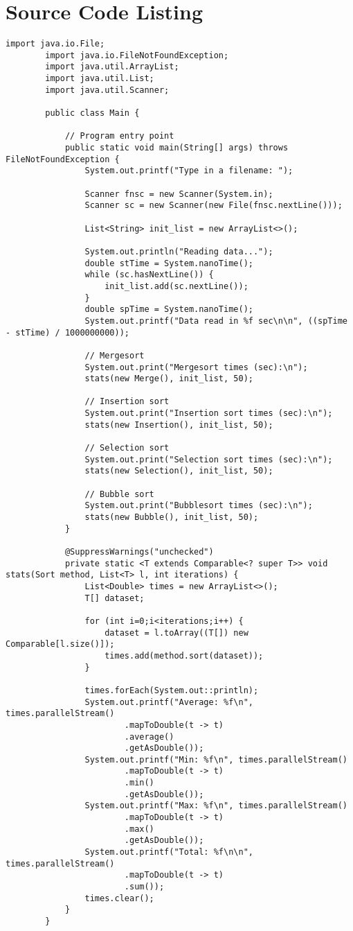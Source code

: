 	\section{Source Code Listing}
	\begin{lstlisting}[caption=Main.java]		
		import java.io.File;
		import java.io.FileNotFoundException;
		import java.util.ArrayList;
		import java.util.List;
		import java.util.Scanner;
		
		public class Main {
		
			// Program entry point
			public static void main(String[] args) throws FileNotFoundException {
				System.out.printf("Type in a filename: ");

                Scanner fnsc = new Scanner(System.in);
                Scanner sc = new Scanner(new File(fnsc.nextLine()));

				List<String> init_list = new ArrayList<>();
				
				System.out.println("Reading data...");
				double stTime = System.nanoTime();
				while (sc.hasNextLine()) {
					init_list.add(sc.nextLine());
				}
				double spTime = System.nanoTime();
				System.out.printf("Data read in %f sec\n\n", ((spTime - stTime) / 1000000000));
				
				// Mergesort
				System.out.print("Mergesort times (sec):\n");
				stats(new Merge(), init_list, 50);
				
				// Insertion sort
				System.out.print("Insertion sort times (sec):\n");
				stats(new Insertion(), init_list, 50);
				
				// Selection sort
				System.out.print("Selection sort times (sec):\n");
				stats(new Selection(), init_list, 50);
				
				// Bubble sort
				System.out.print("Bubblesort times (sec):\n");
				stats(new Bubble(), init_list, 50);
			}
			
			@SuppressWarnings("unchecked")
			private static <T extends Comparable<? super T>> void stats(Sort method, List<T> l, int iterations) {
				List<Double> times = new ArrayList<>();
				T[] dataset;
				
				for (int i=0;i<iterations;i++) {
					dataset = l.toArray((T[]) new Comparable[l.size()]);
					times.add(method.sort(dataset));
				}
				
				times.forEach(System.out::println);
				System.out.printf("Average: %f\n", times.parallelStream()
						.mapToDouble(t -> t)
						.average()
						.getAsDouble());
				System.out.printf("Min: %f\n", times.parallelStream()
						.mapToDouble(t -> t)
						.min()
						.getAsDouble());
				System.out.printf("Max: %f\n", times.parallelStream()
						.mapToDouble(t -> t)
						.max()
						.getAsDouble());
				System.out.printf("Total: %f\n\n", times.parallelStream()
						.mapToDouble(t -> t)
						.sum());
				times.clear();
			}
		}
	\end{lstlisting}
